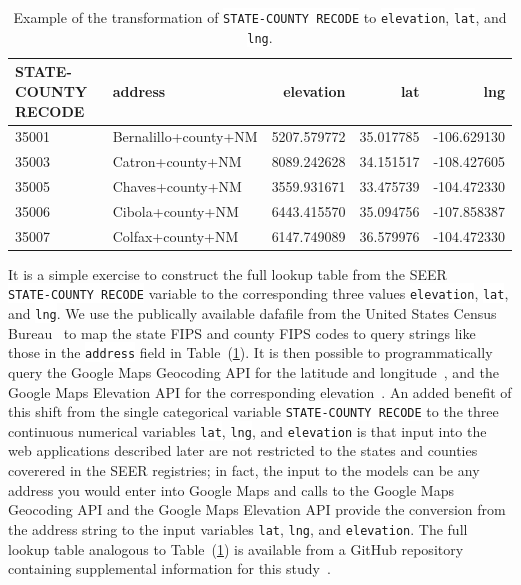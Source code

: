 \documentclass[10pt,letterpaper]{article}
\newcommand{\codewhite}[1]{\colorbox{white}{\texttt{#1}}}
\begin{document}
\begin{table}[!ht]
\begin{adjustwidth}{-2.25in}{0in} %
\caption{\label{tab:nmhead} Example of the transformation of \codewhite{STATE-COUNTY RECODE} to \codewhite{elevation}, \codewhite{lat}, and \codewhite{lng}.}
\begin{tabular}{llrrr}
\toprule
 STATE-COUNTY RECODE &               address &    elevation &        lat &         lng \\
\midrule
35001 &  Bernalillo+county+NM &  5207.579772 &  35.017785 & -106.629130 \\
35003 &      Catron+county+NM &  8089.242628 &  34.151517 & -108.427605 \\
35005 &      Chaves+county+NM &  3559.931671 &  33.475739 & -104.472330 \\
35006 &      Cibola+county+NM &  6443.415570 &  35.094756 & -107.858387 \\
35007 &      Colfax+county+NM &  6147.749089 &  36.579976 & -104.472330 \\
\bottomrule
\end{tabular}
\end{adjustwidth}
\end{table}

It is a simple exercise to construct the full lookup table from the SEER \\  \codewhite{STATE-COUNTY RECODE} variable to the corresponding three values \codewhite{elevation}, \codewhite{lat}, and \codewhite{lng}. We use the publically available dafafile from the United States Census Bureau~\cite{census} to map the state FIPS and county FIPS codes to query strings like those in the \codewhite{address} field in Table~(\ref{tab:nmhead}). 
It is then possible to programmatically query the Google Maps Geocoding API for the latitude and longitude~\cite{geocode}, and the Google Maps Elevation API for the corresponding elevation~\cite{elevation}.
An added benefit of this shift from the single categorical variable \codewhite{STATE-COUNTY RECODE} to the three continuous numerical variables \codewhite{lat}, \codewhite{lng}, and \codewhite{elevation} is that input into the web applications described later are not restricted to the states and counties coverered in the SEER registries; in fact, the input to the models can be any address you would enter into Google Maps and calls to the Google Maps Geocoding API and the Google Maps Elevation API provide the conversion from the address string to the input variables \codewhite{lat}, \codewhite{lng}, and \codewhite{elevation}. The full lookup table analogous to Table~(\ref{tab:nmhead}) is available from a GitHub repository containing supplemental information for this study~\cite{supp}. 
\end{document}
